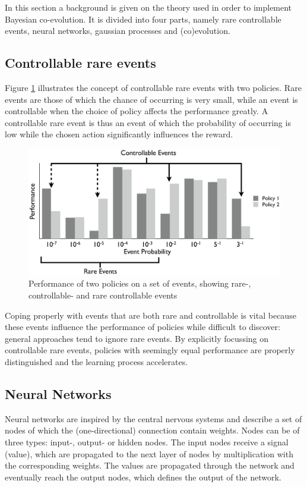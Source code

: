 In this section a background is given on the theory used in order to implement Bayesian co-evolution. It is divided into four parts, namely rare controllable events, neural networks, gaussian processes and (co)evolution. 

\subsection{Controllable rare events}
Figure \ref{rareControllableImage} illustrates the concept of controllable rare events with two policies. Rare events are those of which the chance of occurring is very small, while an event is controllable when the choice of policy affects the performance greatly. A controllable rare event is thus an event of which the probability of occurring is low while the chosen action significantly influences the reward.

\begin{figure}[h]
  \centering
  \includegraphics{images/rare-controllable.png}
  \caption{Performance of two policies on a set of events, showing rare-, controllable- and rare controllable events}\label{rareControllableImage}
\end{figure}

Coping properly with events that are both rare and controllable is vital because these events influence the performance of policies while difficult to discover: general approaches tend to ignore rare events. By explicitly focussing on controllable rare events, policies with seemingly equal performance are properly distinguished and the learning process accelerates.

\subsection{Neural Networks}
Neural networks are inspired by the central nervous systems and describe a set of nodes of which the (one-directional) connection contain weights. Nodes can be of three types: input-, output- or hidden nodes. The input nodes receive a signal (value), which are propagated to the next layer of nodes by multiplication with the corresponding weights. The values are propagated through the network and eventually reach the output nodes, which defines the output of the network. 

